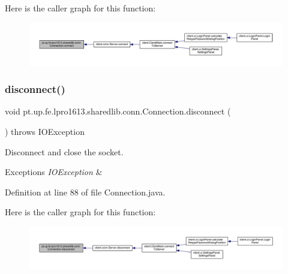 Here is the caller graph for this function\+:
\nopagebreak
\begin{figure}[H]
\begin{center}
\leavevmode
\includegraphics[width=350pt]{classpt_1_1up_1_1fe_1_1lpro1613_1_1sharedlib_1_1conn_1_1_connection_a8ccfed3defecf3a4070c32a0f3d6acb7_icgraph}
\end{center}
\end{figure}
\hypertarget{classpt_1_1up_1_1fe_1_1lpro1613_1_1sharedlib_1_1conn_1_1_connection_a3f57700e6cf5cb4ae80ce06db37ab0fc}{}\label{classpt_1_1up_1_1fe_1_1lpro1613_1_1sharedlib_1_1conn_1_1_connection_a3f57700e6cf5cb4ae80ce06db37ab0fc} 
\subsubsection{\texorpdfstring{disconnect()}{disconnect()}}
{\footnotesize\ttfamily void pt.\+up.\+fe.\+lpro1613.\+sharedlib.\+conn.\+Connection.\+disconnect (\begin{DoxyParamCaption}{ }\end{DoxyParamCaption}) throws I\+O\+Exception}

Disconnect and close the socket.


\begin{DoxyExceptions}{Exceptions}
{\em I\+O\+Exception} & \\
\hline
\end{DoxyExceptions}


Definition at line 88 of file Connection.\+java.

Here is the caller graph for this function\+:
\nopagebreak
\begin{figure}[H]
\begin{center}
\leavevmode
\includegraphics[width=350pt]{classpt_1_1up_1_1fe_1_1lpro1613_1_1sharedlib_1_1conn_1_1_connection_a3f57700e6cf5cb4ae80ce06db37ab0fc_icgraph}
\end{center}
\end{figure}
\hypertarget{classpt_1_1up_1_1fe_1_1lpro1613_1_1sharedlib_1_1conn_1_1_connection_ad2971acbca89cf81dcb5fe0ece0a53c4}{}\label{classpt_1_1up_1_1fe_1_1lpro1613_1_1sharedlib_1_1conn_1_1_connection_ad2971acbca89cf81dcb5fe0ece0a53c4} 
